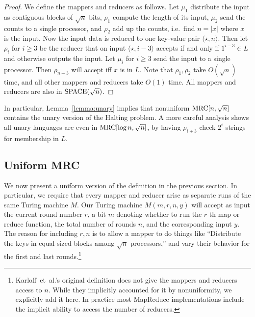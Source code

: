 \documentclass[letterpaper,USenglish]{lipics}
\theoremstyle{definition}
\theoremstyle{remark}
\newcommand{\mrc}{\textup{MRC}}
\newcommand{\SPACE}{\textup{SPACE}}
\begin{document}
\begin{proof}
We define the mappers and reducers as follows. Let $\mu_1$ distribute the input
as contiguous blocks of $\sqrt{n}$ bits, $\rho_1$ compute the length of its
input, $\mu_2$ send the counts to a single processor, and $\rho_2$ add up the
counts, i.e.\ find $n=|x|$ where $x$ is the input. Now the input data is
reduced to one key-value pair $\langle \star, n \rangle$. Then let $\rho_i$ for
$i \ge 3$ be the reducer that on input $\langle \star, i-3 \rangle$ accepts if
and only if $1^{i-3} \in L$ and otherwise outputs the input. Let $\mu_i$ for $i
\ge 3$ send the input to a single processor. Then $\rho_{n+3}$ will accept iff
$x$ is in $L$. Note that $\rho_1, \rho_2$ take $O(\sqrt{n})$ time, and all
other mappers and reducers take $O(1)$ time. All mappers and reducers are also
in $\SPACE(\sqrt{n})$. \end{proof}

In particular, Lemma~\ref{lemma:unary} implies that nonuniform $\mrc[n,
\sqrt{n}]$ contains the unary version of the Halting problem. A more careful
analysis shows all unary languages are even in $\mrc[\log n, \sqrt{n}]$, by
having $\rho_{i+3}$ check $2^i$ strings for membership in $L$.

\subsection{Uniform MRC}\label{sec:uniform}

We now present a uniform version of the definition in the previous section. In
particular, we require that every mapper and reducer arise as separate runs of
the same Turing machine $M$. Our Turing machine $M(m, r, n, y)$ will accept as
input the current round number $r$, a bit $m$ denoting whether to run the
$r$-th map or reduce function, the total number of rounds $n$, and the
corresponding input $y$. The reason for including $r, n$ is to allow a mapper
to do things like ``Distribute the keys in equal-sized blocks among $\sqrt{n}$
processors,'' and vary their behavior for the first and last
rounds.\footnote{Karloff~et~al.'s original definition does not give the mappers
and reducers access to $n$. While they implicitly accounted for it by
nonuniformity, we explicitly add it here. In practice most MapReduce
implementations include the implicit ability to access the number of
reducers.}
\end{document}
